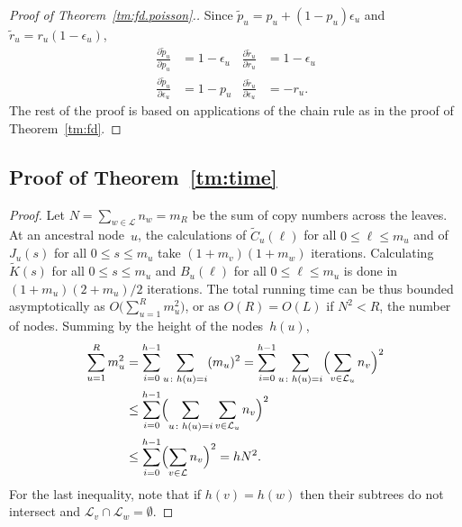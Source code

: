 \documentclass{elsarticle}
\newcommand{\nlik}{C}
\newcommand{\slik}{K}
\newcommand{\nolik}{B}
\newcommand{\solik}{J}
\newcommand{\nx}{u}
\newcommand{\ny}{v}
\newcommand{\nz}{w}
\begin{document}
\begin{proof}[Proof of Theorem~\ref{tm:fd.poisson}.]
Since $\tilde{p}_{\nx}=p_{\nx}+(1-p_{\nx})\epsilon_{\nx}$ and $\tilde{r}_{\nx}=r_{\nx}(1-\epsilon_{\nx})$,
\begin{align*}
\frac{\partial \tilde{p}_{\nx}}{\partial p_{\nx}} & = 1-\epsilon_{\nx}
& \frac{\partial \tilde{r}_{\nx}}{\partial r_{\nx}} & = 1-\epsilon_{\nx}
\\
\frac{\partial \tilde{p}_{\nx}}{\partial \epsilon_{\nx}} & = 1-p_{\nx}
&
\frac{\partial \tilde{r}_{\nx}}{\partial \epsilon_{\nx}} & = -r_{\nx}.
\end{align*}
The rest of the proof is based on applications of the chain rule as in the proof of Theorem~\ref{tm:fd}. 
\end{proof}

\subsection{Proof of Theorem~\ref{tm:time}}
\begin{proof}
Let $N=\sum_{\nz\in\mathcal{L}} n_{\nz}=m_R$ be the sum of copy numbers across the leaves. 
At an ancestral node~$\nx$, 
the calculations of $\tilde{\nlik}_{\nx}(\ell)$ for all $0\le \ell\le m_{\nx}$ 
and of $\solik_{\nx}(s)$ for all $0\le s\le m_{\nx}$ take
$(1+m_{\ny})(1+m_{\nz})$ iterations. 
Calculating $\tilde{\slik}(s)$ for all $0\le s\le m_{\nx}$ and 
$\nolik_{\nx}(\ell)$ for all $0\le \ell\le m_{\nx}$ 
is done in~$(1+m_{\nx})(2+m_{\nx})/2$ iterations.  
The total running time can be thus bounded 
asymptotically as $O\bigl(\sum_{\nx=1}^R m_{\nx}^2\bigr)$, 
or as $O(R)=O(L)$ if $N^2<R$, the number of nodes. 
Summing by the height of the nodes~$h(\nx)$, 
\begin{align*}
\sum_{\nx=1}^R m_{\nx}^2
& = \sum_{i=0}^{h-1}
	\sum_{\nx\colon h(\nx)=i} (m_{\nx})^2
	= \sum_{i=0}^{h-1} \sum_{\nx\colon h(\nx)=i} \Bigl(\sum_{\ny\in \mathcal{L}_{\nx}} n_{\ny}\Bigr)^2
\\
& \le \sum_{i=0}^{h-1} \Bigl(\sum_{\nx\colon h(\nx)=i}  \sum_{\ny\in \mathcal{L}_{\nx}} n_{\ny}\Bigr)^2
\\
& \le \sum_{i=0}^{h-1} \Bigl(\sum_{\ny\in \mathcal{L}} n_{\ny}\Bigr)^2
= h N^2.
\end{align*}
For the last inequality, note that if $h(\ny)=h(\nz)$ then their subtrees do not intersect
and $\mathcal{L}_{\ny}\cap \mathcal{L}_{\nz}=\emptyset$. 
\end{proof}
\end{document}
